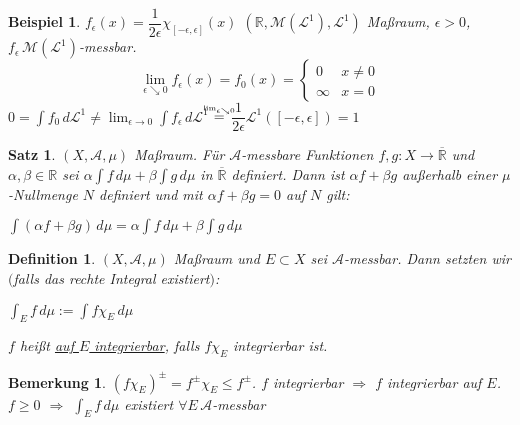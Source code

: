 \documentclass[11pt]{memoir}
\theoremstyle{changebreak}
\newtheorem{Definition}{Definition}[chapter]
\newtheorem{Bemerkung}{Bemerkung}[chapter]
\newtheorem{Beispiel}{Beispiel}[chapter]
\newtheorem{Satz}{Satz}[chapter]
\newcommand\overequal[1]{\mathrel{\overset{\makebox[0pt]{\mbox{\normalfont\tiny\sffamily $ #1 $}}}{=}}}
\begin{document}
\begin{Beispiel}

	$f_{\epsilon} (x) = \dfrac{1}{2\epsilon} \chi_{[-\epsilon, \epsilon]}(x)$
$(\mathbb R, \mathscr M(\mathscr L^1), \mathscr L^1)$ Maßraum, $\epsilon > 0$, $f_\epsilon \, \mathscr M(\mathscr L^1)$-messbar.
\begin{equation}
	\lim_{\epsilon \searrow 0} f_\epsilon (x) = f_0 (x) =
	\begin{cases}
		0 & x \ne 0 \\
		\infty & x = 0
	\end{cases}
\end{equation}
$0 = \int f_0 \, d\mathscr L^1 \ne \lim_{\epsilon \rightarrow 0} \int f_\epsilon \, d\mathscr L^1$ $\overequal{\lim_{\epsilon \searrow 0}}$ $\dfrac{1}{2\epsilon} \mathscr L^1([-\epsilon, \epsilon]) =1$
\end{Beispiel}


\begin{Satz}
$(X, \mathscr A, \mu)$ Maßraum. Für $\mathscr A$-messbare Funktionen $f, g: X \rightarrow \overline{\mathbb R} $ und $\alpha, \beta \in \mathbb R$ sei $\alpha\int f \, d\mu + \beta \int g \, d\mu$ in $\overline{\mathbb R}$ definiert. Dann ist $\alpha f + \beta g$ außerhalb einer $\mu$-Nullmenge $N$ definiert und mit $\alpha f + \beta g = 0$ auf $N$ gilt: \\
\begin{center}
	$\int (\alpha f + \beta g) \, d\mu = \alpha \int f \, d\mu + \beta \int g \, d\mu$
\end{center}
\end{Satz}

\begin{Definition}
$(X, \mathscr A, \mu)$ Maßraum und $E \subset X$ sei $\mathscr A$-messbar. Dann setzten wir $($falls das rechte Integral existiert$)$:
\begin{center}
	$\int_E f \, d\mu := \int f \chi_E \, d\mu$
\end{center}
$f$ heißt \underline{auf $E$ integrierbar}, falls $f \chi_E$ integrierbar ist.
\end{Definition}

\begin{Bemerkung}
$(f \chi_E)^\pm = f^\pm \chi_E \leq f^\pm$. $f$ integrierbar $\Rightarrow$ $f$ integrierbar auf $E$. \\
$f \geq 0$ $\Rightarrow$ $\int_E f \, d\mu$ existiert $\forall E \, \mathscr A$-messbar
\end{Bemerkung}
\end{document}
